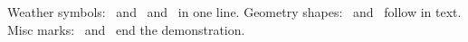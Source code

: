 \documentclass{article}
\begin{document}
Weather symbols: \Sun\ and \Cloud\ and \Rain\ in one line.
Geometry shapes: \Square\ and \Circle\ follow in text.
Misc marks: \Letter\ and \Telephone\ end the demonstration.
\end{document}
